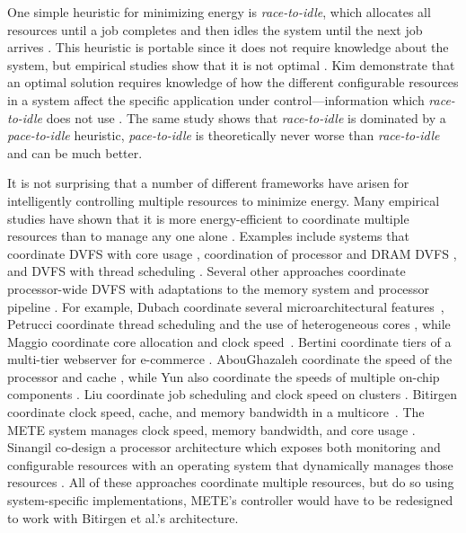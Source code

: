 One simple heuristic for minimizing energy is \emph{race-to-idle}, which allocates all resources until a job completes and then idles the system until the next job arrives \cite{google}.
This heuristic is portable since it does not require knowledge about the system, but empirical studies show that it is not optimal \cite{google,Cheng2009,Yang2007,Yun2010}.
Kim \etal demonstrate that an optimal solution requires knowledge of how the different configurable resources in a system affect the specific application under control---information which \emph{race-to-idle} does not use \cite{kim-cpsna2015}.
The same study shows that \emph{race-to-idle} is dominated by a \emph{pace-to-idle} heuristic, \ie \emph{pace-to-idle} is theoretically never worse than \emph{race-to-idle} and can be much better.

It is not surprising that a number of different frameworks have arisen for intelligently controlling multiple resources to minimize energy.
Many empirical studies have shown that it is more energy-efficient to coordinate multiple resources than to manage any one alone \cite{google,Cheng2009,Yang2007,Yun2010}.
Examples include systems that coordinate DVFS with core usage \cite{packandcap-old,TCST,packandcap-new}, coordination of processor and DRAM DVFS \cite{Chen2011,CoScale,Felter2005,Li2007}, and DVFS with thread scheduling \cite{Rangan2009,Winter2010}.
Several other approaches coordinate processor-wide DVFS with adaptations to the memory system and processor pipeline \cite{Bitirgen2008,dubach2010,METE}.
For example, Dubach \etal coordinate several microarchitectural features~\cite{dubach2010},
Petrucci \etal coordinate thread scheduling and the use of heterogeneous cores \cite{Petrucci2012}, while Maggio \etal coordinate core allocation and clock speed~\cite{TCST}.
Bertini \etal coordinate tiers of a multi-tier webserver for e-commerce \cite{Bertini2007}.
AbouGhazaleh \etal coordinate the speed of the processor and cache \cite{AbouGhazaleh2007}, while Yun \etal also coordinate the speeds of multiple on-chip components \cite{Yun2010}.
Liu \etal coordinate job scheduling and clock speed on clusters \cite{Liu2008}.
Bitirgen \etal coordinate clock speed, cache, and memory bandwidth in a multicore~\cite{Bitirgen2008}.
The METE system manages clock speed, memory bandwidth, and core usage \cite{METE}.
Sinangil \etal co-design a processor architecture which exposes both monitoring and configurable resources with an operating system that dynamically manages those resources \cite{sinangil2014self}.
All of these approaches coordinate multiple resources, but do so using system-specific implementations, \eg METE's controller would have to be redesigned to work with Bitirgen et al.'s architecture.

